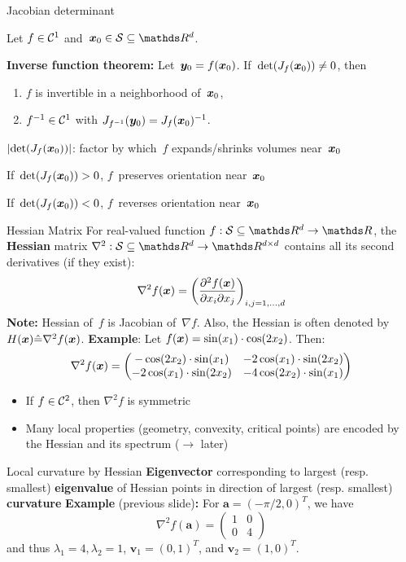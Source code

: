 \documentclass[11pt,compress,t,notes=noshow, xcolor=table]{beamer}
\begin{document}
\begin{framei}{Jacobian determinant}
\item Let $f\in\mathcal{C}^{1}$ and~$\xv_0\in\S\subseteq \R^d$.
\item \textbf{Inverse function theorem:} Let~$\bm{y}_0=f(\bm{x}_0)$. If~$\det(J_f(\bm{x}_0))\not=0$, then
\begin{enumerate}
\item $f$ is invertible in a neighborhood of~$\bm{x}_0$,
\item $f^{-1}\in\mathcal{C}^{1}$ with $J_{f^{-1}}(\bm{y}_0) = J_f(\bm{x}_0)^{-1}$.
\end{enumerate}
\item $|{\det(J_f(\bm{x}_0))}|$: factor by which~$f$ expands/shrinks volumes near~$\bm{x}_0$
\item If~$\det(J_f(\bm{x}_0))>0$, $f$~preserves orientation near~$\bm{x}_0$
\item If~$\det(J_f(\bm{x}_0))<0$, $f$~reverses orientation near~$\bm{x}_0$
\end{framei}


\begin{framev}{Hessian Matrix}
For real-valued function $f:\S\subseteq \R^d \to \R$, the \textbf{Hessian} matrix $\nabla^2:\S\subseteq \R^d \to \R^{d \times d}$ contains all its second derivatives (if they exist):
$$
\nabla^2 f(\bm{x}) = \left(\frac{\partial^2 f(\bm{x})}{\partial x_i \partial x_j}\right)_{i,j=1,\ldots,d}
$$
\textbf{Note:} Hessian of~$f$ is Jacobian of~$\nabla f$. Also, the Hessian is often denoted by $H(\bm{x})\hat{=}\nabla^2 f(\bm{x})$.
\spacer
\textbf{Example}: Let $f(\bm{x}) = \sin(x_1) \cdot \cos(2x_2)$.
Then:
$$
\nabla^2 f(\bm{x}) = \begin{pmatrix}
-\cos(2x_2)\cdot\sin(x_1) & -2\cos(x_1)\cdot\sin(2x_2) \\
-2\cos(x_1)\cdot\sin(2x_2) & -4\cos(2x_2)\cdot\sin(x_1)
\end{pmatrix}
$$
\begin{itemize}
\item If $f\in\mathcal{C}^{2}$, then $\nabla^2 f$ is symmetric
\item Many local properties (geometry, convexity, critical points) are encoded by the Hessian and its spectrum ($\rightarrow$ later)
\end{itemize}
\end{framev}


\begin{framev}{Local curvature by Hessian}
\textbf{Eigenvector} corresponding to largest (resp. smallest) \textbf{eigenvalue} of Hessian points in direction of largest (resp. smallest) \textbf{curvature}
\spacer
\textbf{Example} (previous slide)\textbf{:}
For $\bm{a}=(-\pi/2,0)^T$, we have
$$
\nabla^2 f(\bm{a}) = \begin{pmatrix}
1 & 0 \\ 0 & 4
\end{pmatrix}
$$
and thus $\lambda_1=4, \lambda_2=1$, $\bm{v}_1=(0, 1)^T$, and $\bm{v}_2=(1, 0)^T$.
\vfill
{}
\end{framev}
\end{document}
